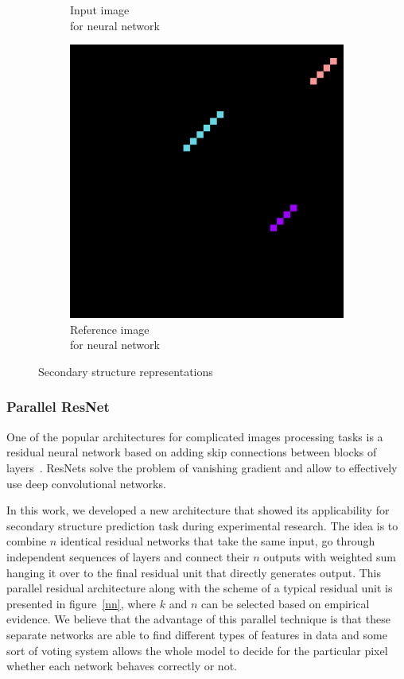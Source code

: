 \begin{figure}[h]
\begin{subfigure}{.33\textwidth}
  \caption{Input image \\ for neural network}
  \label{struc_b}
\end{subfigure}
\begin{subfigure}{.33\textwidth}
  \centering
  \hbox{\includegraphics[width=\linewidth]{pics/out.png}}
  \caption{Reference image \\ for neural network}
  \label{struc_c}
\end{subfigure}
\caption{Secondary structure representations}
\label{struc}
\end{figure}

\subsubsection{Parallel ResNet}
One of the popular architectures for complicated images processing tasks is a residual neural network based on adding skip connections between blocks of layers~\cite{he2016deep}. ResNets solve the problem of vanishing gradient and allow to effectively use deep convolutional networks.

In this work, we developed a new architecture that showed its applicability for secondary structure prediction task during experimental research. The idea is to combine $n$ identical residual networks that take the same input, go through independent sequences of layers and connect their $n$ outputs with weighted sum hanging it over to the final residual unit that directly generates output. This parallel residual architecture along with the scheme of a typical residual unit is presented in figure~\ref{nn}, where $k$ and $n$ can be selected based on empirical evidence. We believe that the advantage of this parallel technique is that these separate networks are able to find different types of features in data and some sort of voting system allows the whole model to decide for the particular pixel whether each network behaves correctly or not.

